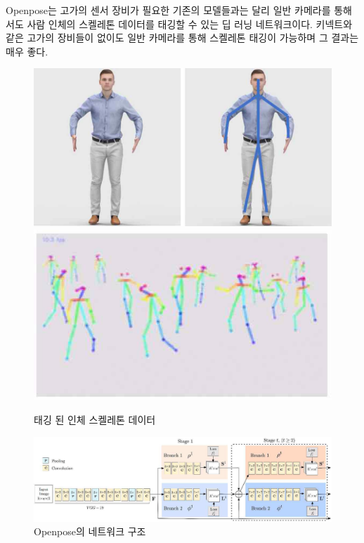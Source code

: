 \documentclass[chapter,oneside]{oblivoir}
\begin{document}
Openpose는 고가의 센서 장비가 필요한 기존의 모델들과는 달리 일반 카메라를 통해서도 사람 인체의 스켈레톤 데이터를 태깅할 수 있는 딥 러닝 네트워크이다. 키넥트와 같은 고가의 장비들이 없이도 일반 카메라를 통해 스켈레톤 태깅이 가능하며 그 결과는 매우 좋다.
\begin{figure}[h!]
\centering
\includegraphics{pic/chp3/img761}
\includegraphics{pic/chp3/img762}
\caption{태깅 된 인체 스켈레톤 데이터}
\end{figure}
\begin{figure}[h!]
  \centering
    \includegraphics[scale = 0.5]{pic/chp3/img763}
  \caption{Openpose의 네트워크 구조\cite{reference10}}
\end{figure}
\end{document}
